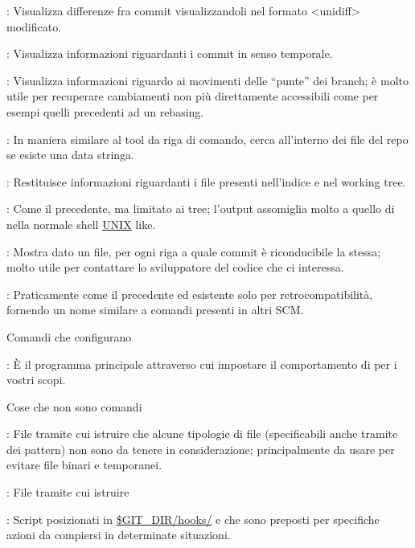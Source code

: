\elemento{}: Visualizza differenze fra commit visualizzandoli nel
formato \evidenzia<unidiff>
modificato.

\elemento{}: Visualizza informazioni riguardanti i commit in senso
temporale.

\elemento{}: Visualizza informazioni riguardo ai movimenti delle
``punte'' dei branch; \`e molto utile per recuperare cambiamenti non pi\`u
direttamente accessibili come per esempi quelli precedenti ad un rebasing.

\elemento{}: In maniera similare al tool da riga di comando, cerca
all'interno dei file del repo se esiste una data stringa.

\elemento{}: Restituisce informazioni riguardanti i file presenti
nell'indice e nel working tree.

\elemento{}: Come il precedente, ma limitato ai tree; l'output
assomiglia molto a quello di  nella normale shell \url{UNIX} like.

\elemento{}: Mostra dato un file, per ogni riga
a quale commit \`e riconducibile la stessa; molto utile per contattare lo
sviluppatore del codice che ci interessa.

\elemento{}: Praticamente come il precedente ed esistente solo per
retrocompatibilit\`a, fornendo un nome similare a comandi presenti in altri SCM.

\sezione Comandi che configurano

\elemento{}: \`E il programma principale attraverso cui impostare il
comportamento di  per i vostri scopi.

\sezione Cose che non sono comandi

\elemento{}: File tramite cui istruire  che alcune
tipologie di file (specificabili anche tramite dei pattern) non sono da tenere
in considerazione; principalmente da usare per evitare file binari e
temporanei.

\elemento{}: File tramite cui istruire 

\elemento{}: Script posizionati in \url{$GIT_DIR/hooks/} e che sono
preposti per specifiche azioni da compiersi in determinate situazioni.

